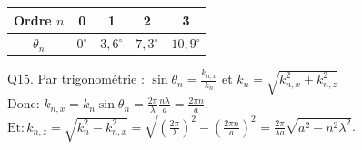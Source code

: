 \documentclass[10pt]{article}
\begin{document}
\begin{center}
\begin{tabular}{|c|c|c|c|c|}
\hline
Ordre \(n\) & 0 & 1 & 2 & 3 \\
\hline
\(\theta_{n}\) & \(0^{\circ}\) & \(3,6^{\circ}\) & \(7,3^{\circ}\) & \(10,9^{\circ}\) \\
\hline
\end{tabular}
\end{center}

Q15. Par trigonométrie : \(\sin \theta_{n}=\frac{k_{n, x}}{k_{n}}\) et \(k_{n}=\sqrt{k_{n, x}^{2}+k_{n, z}^{2}}\)\\
Donc: \(k_{n, x}=k_{n} \sin \theta_{n}=\frac{2 \pi}{\lambda} \frac{n \lambda}{a}=\frac{2 \pi n}{a}\).\\
\(\mathrm{Et}: k_{n, z}=\sqrt{k_{n}^{2}-k_{n, x}^{2}}=\sqrt{\left(\frac{2 \pi}{\lambda}\right)^{2}-\left(\frac{2 \pi n}{a}\right)^{2}}=\frac{2 \pi}{\lambda a} \sqrt{a^{2}-n^{2} \lambda^{2}}\).
\end{document}
